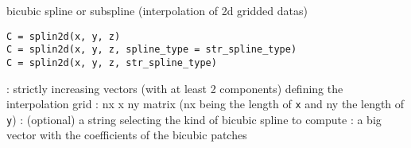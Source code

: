 
\begin{mandesc}
   {bicubic spline or subspline (interpolation of 2d
    gridded datas)}
\end{mandesc}

\begin{calling_sequence}
\begin{verbatim}
C = splin2d(x, y, z)
C = splin2d(x, y, z, spline_type = str_spline_type)
C = splin2d(x, y, z, str_spline_type)
\end{verbatim}
\end{calling_sequence}

\begin{parameters}
  \begin{varlist}
   : strictly increasing vectors (with at least 2 components)
               defining the interpolation grid
   : nx x ny matrix (nx being the length of \verb!x! and 
               ny the length of \verb!y!)
   : (optional) a string selecting the kind of bicubic spline to compute
   : a big vector with the coefficients of the bicubic patches
  \end{varlist}
\end{parameters}

